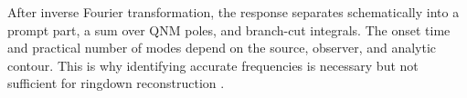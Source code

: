 After inverse Fourier transformation, the response separates schematically
into a prompt part, a sum over QNM poles, and branch-cut integrals.  The onset
time and practical number of modes depend on the source, observer, and
analytic contour.  This is why identifying accurate frequencies is necessary
but not sufficient for ringdown reconstruction
\cite{Baibhav:2023clw,Cheung:2023vki,Mitman:2025hgy,
Oshita:2025ibu}.
